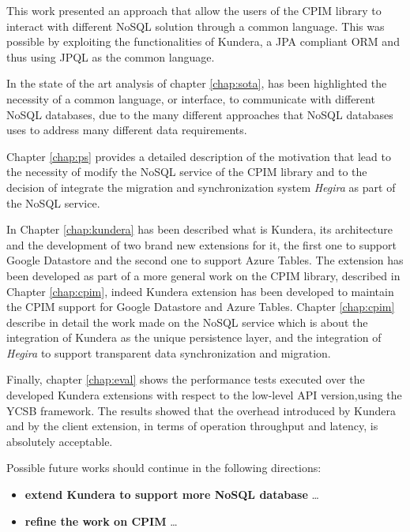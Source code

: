 This work presented an approach that allow the users of the CPIM library to interact with different NoSQL solution through a common language. This was possible by exploiting the functionalities of Kundera, a JPA compliant ORM and thus using JPQL as the common language.

\noindent In the state of the art analysis of chapter \ref{chap:sota}, has been highlighted the necessity of a common language, or interface, to communicate with different NoSQL databases, due to the many different approaches that NoSQL databases uses to address many different data requirements.

\noindent Chapter \ref{chap:ps} provides a detailed description of the motivation that lead to the necessity of modify the NoSQL service of the CPIM library and to the decision of integrate the migration and synchronization system \textit{Hegira} as part of the NoSQL service.

\noindent In Chapter \ref{chap:kundera} has been described what is Kundera, its architecture and the development of two brand new extensions for it, the first one to support Google Datastore and the second one to support Azure Tables. The extension has been developed as part of a more general work on the CPIM library, described in Chapter \ref{chap:cpim}, indeed Kundera extension has been developed to maintain the CPIM support for Google Datastore and Azure Tables. Chapter \ref{chap:cpim} describe in detail the work made on the NoSQL service which is about the integration of Kundera as the unique persistence layer, and the integration of \textit{Hegira} to support transparent data synchronization and migration.

\noindent Finally, chapter \ref{chap:eval} shows the performance tests executed over the developed Kundera extensions with respect to the low-level API version,using the YCSB framework. The results showed that the overhead introduced by Kundera and by the client extension, in terms of operation throughput and latency, is absolutely acceptable.

\newparagraph Possible future works should continue in the following directions:
\begin{itemize}
\item \textbf{extend Kundera to support more NoSQL database} \dots
\item \textbf{refine the work on CPIM} \dots
\end{itemize}